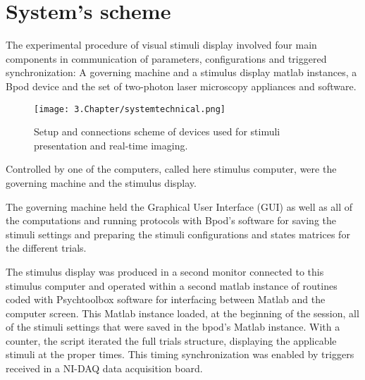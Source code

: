 \section{System's scheme}
\label{sec:sectionb}

The experimental procedure of visual stimuli display involved four main components in communication of parameters, configurations and triggered synchronization: A governing machine and a stimulus display matlab instances, a Bpod device and the set of two-photon laser microscopy appliances and software. 

\begin{figure}[H]
	\centering
		\texttt{[image: 3.Chapter/systemtechnical.png]}
	\caption[c1]{Setup and connections scheme of devices used for stimuli presentation and real-time imaging.}
	\label{fig:systemtechnical}
\end{figure}

Controlled by one of the computers, called here stimulus computer, were the governing machine and the stimulus display.

The governing machine held the Graphical User Interface (GUI) as well as all of the computations and running protocols with Bpod's software for saving the stimuli settings and preparing the stimuli configurations and states matrices for the different trials. 

The stimulus display was produced in a second monitor connected to this stimulus computer and operated within a second matlab instance of routines coded with Psychtoolbox software for interfacing between Matlab and the computer screen. This Matlab instance loaded, at the beginning of the session, all of the stimuli settings that were saved in the bpod's Matlab instance. With a counter, the script iterated the full trials structure, displaying the applicable stimuli at the proper times. This timing synchronization was enabled by triggers received in a NI-DAQ data acquisition board. 

